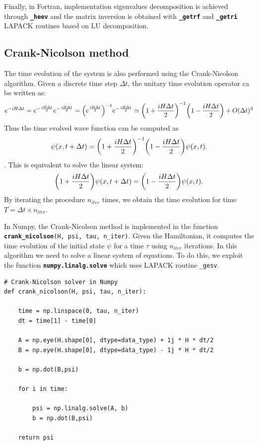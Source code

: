 \documentclass[rmp,10pt,onecolumn,fleqn,notitlepage]{revtex4-1}
\begin{document}
Finally, in Fortran, implementation eigenvalues decomposition is achieved through {\bfseries\texttt{\_heev}} and the matrix inversion is obtained with {\bfseries\texttt{\_getrf}} and {\bfseries\texttt{\_getri}} LAPACK routines based on LU decomposition.

\subsection{Crank-Nicolson method}
\label{subsec:crank-nicolson}
The time evolution of the system is also performed using the Crank-Nicolson algorithm. Given a discrete time step $\Delta t$, the unitary time evolution operator ca be written as:
\begin{equation}
    e^{-iH\Delta t} = e^{-\frac{iH\Delta t}{2}} e^{-\frac{iH\Delta t}{2}} = \qty( e^{\frac{iH\Delta t}{2}} )^{-1} e^{-\frac{iH\Delta t}{2}}
    \simeq  \qty( 1 + \frac{iH\Delta t}{2} )^{-1} 
    \qty( 1 - \frac{iH\Delta t}{2} ) + O(\Delta t)^3
\end{equation}
Thus the time evolved wave function can be computed as
\begin{equation}
    \psi(x,t+\Delta t) = 
    \qty( 1 + \frac{iH\Delta t}{2} )^{-1} 
    \qty( 1 - \frac{iH\Delta t}{2} ) \psi(x,t).
\end{equation}.
This is equivalent to solve the linear system:
\begin{equation}
    \qty( 1 + \frac{iH\Delta t}{2} )    \psi(x,t+\Delta t) = \qty( 1 - \frac{iH\Delta t}{2} ) \psi(x,t).
\end{equation}
By iterating the procedure $n_{iter}$ times, we obtain the time evolution for time $T = \Delta t \times n_{iter}$.

In Numpy, the Crank-Nicolson method is implemented in the function {\bfseries\texttt{crank\_nicolson}}\texttt{(H, psi, tau, n\_iter)}. Given the Hamiltonian, it computes the time evolution of the initial state $\psi$ for a time $\tau$ using $n_{iter}$ iterations. In this algorithm we need to solve a linear system of equations. To do this, we exploit the function {\bfseries\texttt{numpy.linalg.solve}} which uses LAPACK routine \texttt{\_gesv}. 

\begin{lstlisting}[style=myPython]
# Crank-Nicolson solver in Numpy
def crank_nicolson(H, psi, tau, n_iter):
    
    time = np.linspace(0, tau, n_iter)
    dt = time[1] - time[0]
    
    A = np.eye(H.shape[0], dtype=data_type) + 1j * H * dt/2
    B = np.eye(H.shape[0], dtype=data_type) - 1j * H * dt/2

    b = np.dot(B,psi) 

    for i in time:
        
        psi = np.linalg.solve(A, b)
        b = np.dot(B,psi) 
        
    return psi  
\end{lstlisting}
\end{document}
